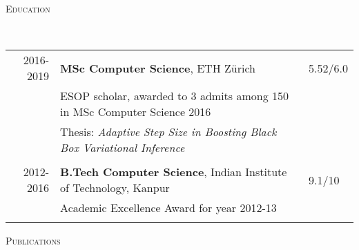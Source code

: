 \documentclass[9pt]{article}
\renewcommand{\arraystretch}{1.5}
\newenvironment{changemargin}[2]{%
  \begin{list}{}{%
      \setlength{\topsep}{0pt}%
    \setlength{\leftmargin}{#1}%
    \setlength{\rightmargin}{#2}%
    \setlength{\listparindent}{\parindent}%
  \setlength{\itemindent}{\parindent}%
    \setlength{\parsep}{\parskip}%
    }%
  \item[]}{\end{list}
    }
\newcommand{\lineover}{
  \begin{changemargin}{-0.05in}{-0.10in}
    \vspace*{-9pt}
    \hrulefill \\
    \vspace*{-2pt}
  \end{changemargin}
}
\newcommand{\header}[1]{
  \begin{changemargin}{-0.5in}{-0.5in}
    \scshape{#1}\\
        \lineover
  \end{changemargin}
}
\begin{document}
\header{Education}
\vspace{4pt}
  \renewcommand{\arraystretch}{1}
  \begin{tabular}{rll}
    2016-2019 & \textbf{MSc Computer Science},  ETH Z{\"u}rich  & 5.52/6.0 \\
            & ESOP scholar, awarded to 3 admits among 150 in MSc Computer Science 2016 &\\
            & Thesis: \emph{Adaptive Step Size in Boosting Black Box Variational Inference} &\\\\
    2012-2016 & \textbf{B.Tech Computer Science},  Indian Institute of Technology, Kanpur & 9.1/10 \\ 
            &  Academic Excellence Award for year 2012-13 & \\\\
  \end{tabular}

\header{Publications}
\end{document}
